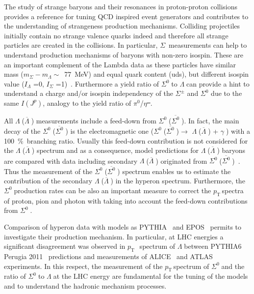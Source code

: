 \documentclass[ALICE,manyauthors]{cernphprep}
\newcommand{\sig}{\ensuremath{\Sigma^0  \; }}
\newcommand{\asig}{\ensuremath{\overline{\Sigma^0} \; }}
\newcommand{\gam}{\ensuremath{\gamma \; }}
\newcommand{\lam}{\ensuremath{\Lambda \; }}
\newcommand{\alam}{\ensuremath{\overline{\Lambda} \; }}
\newcommand{\pt}{\ensuremath{p_{\mathrm{T}\; }}}
\newcommand{\red}{\textcolor{red}}
\providecommand{\DIFaddtex}[1]{{\protect\color{blue}\uwave{#1}}} %
\providecommand{\DIFdeltex}[1]{{\protect\color{red}\sout{#1}}}                      %
\providecommand{\DIFaddbegin}{} %
\providecommand{\DIFaddend}{} %
\providecommand{\DIFdelbegin}{} %
\providecommand{\DIFdelend}{} %
\providecommand{\DIFadd}[1]{\texorpdfstring{\DIFaddtex{#1}}{#1}} %
\providecommand{\DIFdel}[1]{\texorpdfstring{\DIFdeltex{#1}}{}} %
\begin{document}
The study of strange baryons and their resonances in proton-proton collisions provides a reference for tuning QCD 
inspired event generators and contributes to the understanding of strangeness production mechanisms. Colliding projectiles initially 
contain no strange valence quarks indeed and therefore all strange particles are created in the 
collisions. In particular, $\Sigma$~measurements can help to understand production mechanisms of baryons with non-zero 
isospin. These are an important complement of the Lambda data as these particles have similar mass 
($m_{\Sigma} - m_{\Lambda} \sim$~77~MeV) and equal quark content (uds), but different isospin value 
($I_{\Lambda}$ =0, $I_{\Sigma}$ =1)~\cite{cite:PDG}. Furthermore a yield ratio of \sig to \lam can provide 
a hint to understand a charge and/or isospin independency of the $\Sigma^\pm$ and $\Sigma^0$ due to the same $I(J^p)$, 
analogy to the yield ratio of $\pi^0$/$\eta$\DIFdelbegin \DIFdel{\red{~\cite{cite:pi_eta}}}\DIFdelend \DIFaddbegin \DIFadd{\red{~\cite{cite:pi0-2012}}}\DIFaddend .

All \lam (\alam) measurements include a feed-down from \sig (\asig). In fact, the main decay of the \sig (\asig) is the 
electromagnetic one (\sig (\asig)$\to $ \lam (\alam) + \gam) with a 100~\%~branching ratio. Usually this feed-down contribution 
is not considered for the \lam (\alam) spectrum and as a consequence, model predictions for \lam (\alam) baryons are 
compared with data including secondary \lam (\alam) originated from \sig (\asig)\red{~\cite{cite:lamda_model}}. 
Thus the measurement of the \sig (\asig) spectrum enables us to estimate the contribution of the secondary \lam (\alam) 
in the hyperon spectrum. Furthermore, the \sig production rates can be also an important measure to correct the \pt spectra of
proton, pion and photon with taking into account the feed-down contributions from \sig\DIFaddbegin \DIFadd{\red{~\cite{cite:feed-down}}}\DIFaddend .

Comparison of hyperon data with models as  PYTHIA~\cite{cite:pythia6} and EPOS~\cite{cite:EPOS3} permits 
to investigate their production mechanism. In particular, at LHC energies a significant disagreement was observed in 
\pt~spectrum of \lam between PYTHIA6 Perugia 2011~\cite{cite:pythia6} predictions and measurements of 
ALICE~\cite{cite:DDChin-Lam} and ATLAS~\cite{cite:ATLAS-Lam-pp-2011} experiments. 
In this respect, the measurement of the \pt spectrum of  \sig and the ratio of \sig to \lam at the LHC energy
are fundamental for the tuning of the models and to understand the hadronic mechanism 
processes.
\end{document}
